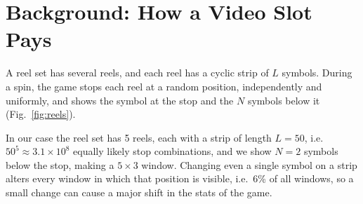 \section{Background: How a Video Slot Pays}
\label{sec:background}

A reel set has several reels, and each reel has a cyclic strip of $L$ symbols. During a spin, the game stops each reel at a random position, independently and uniformly, and shows the symbol at the stop and the $N$ symbols below it (Fig.~\ref{fig:reels}).

In our case the reel set has 5 reels, each with a strip of length $L = 50$, i.e.\ $50^5 \approx 3.1 \times 10^8$ equally likely stop combinations, and we show $N = 2$ symbols below the stop, making a $5 \times 3$ window. Changing even a single symbol on a strip alters every window in which that position is visible, i.e.\ 6\% of all windows, so a small change can cause a major shift in the stats of the game.

